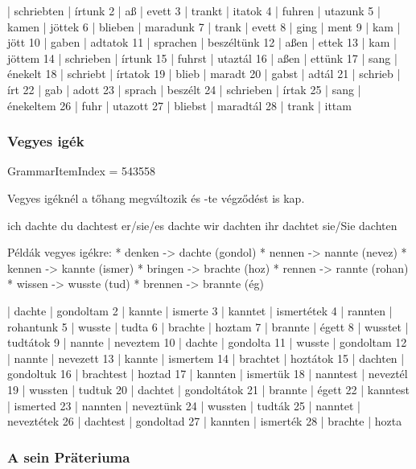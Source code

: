 \documentclass{article}
\newenvironment{desc}{\verbatim}{\endverbatim}
\newenvironment{exmp}{\verbatim}{\endverbatim}
\begin{document}
\begin{exmp}
1 | schriebten | írtunk
2 | aß | evett
3 | trankt | itatok
4 | fuhren | utazunk
5 | kamen | jöttek
6 | blieben | maradunk
7 | trank | evett
8 | ging | ment
9 | kam | jött
10 | gaben | adtatok
11 | sprachen | beszéltünk
12 | aßen | ettek
13 | kam | jöttem
14 | schrieben | írtunk
15 | fuhrst | utaztál
16 | aßen | ettünk
17 | sang | énekelt
18 | schriebt | írtatok
19 | blieb | maradt
20 | gabst | adtál
21 | schrieb | írt
22 | gab | adott
23 | sprach | beszélt
24 | schrieben | írtak
25 | sang | énekeltem
26 | fuhr | utazott
27 | bliebst | maradtál
28 | trank | ittam
\end{exmp}

\subsubsection{Vegyes igék}

GrammarItemIndex = 543558

\begin{desc}
Vegyes igéknél a tőhang megváltozik és -te végződést is kap.

ich dachte
du dachtest
er/sie/es dachte
wir dachten
ihr dachtet
sie/Sie dachten

Példák vegyes igékre:
* denken -> dachte (gondol)
* nennen -> nannte (nevez)
* kennen -> kannte (ismer)
* bringen -> brachte (hoz)
* rennen -> rannte (rohan)
* wissen -> wusste (tud)
* brennen -> brannte (ég)
\end{desc}

\begin{exmp}
1 | dachte | gondoltam
2 | kannte | ismerte
3 | kanntet | ismertétek
4 | rannten | rohantunk
5 | wusste | tudta
6 | brachte | hoztam
7 | brannte | égett
8 | wusstet | tudtátok
9 | nannte | neveztem
10 | dachte | gondolta
11 | wusste | gondoltam
12 | nannte | nevezett
13 | kannte | ismertem
14 | brachtet | hoztátok
15 | dachten | gondoltuk
16 | brachtest | hoztad
17 | kannten | ismertük
18 | nanntest | neveztél
19 | wussten | tudtuk
20 | dachtet | gondoltátok
21 | brannte | égett
22 | kanntest | ismerted
23 | nannten | neveztünk
24 | wussten | tudták
25 | nanntet | neveztétek
26 | dachtest | gondoltad
27 | kannten | ismerték
28 | brachte | hozta
\end{exmp}

\subsubsection{A sein Präteriuma}
\end{document}
